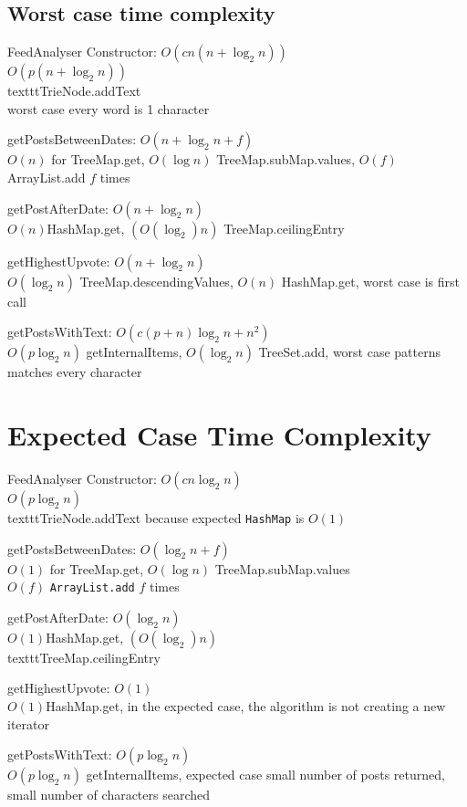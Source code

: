 \documentclass[11pt, oneside]{article}   	%
\begin{document}
\subsection{Worst case time complexity}

\begin{description}

\item FeedAnalyser Constructor: $O(c n (n + \log_2 n))$ \\
$O(p (n + \log_2 n))$ \\texttt{TrieNode.addText} \\ worst case every word is 1 character 
\item getPostsBetweenDates: $O(n + \log_2 n + f)$ \\
$O(n)$ for TreeMap.get, $O(\log n)$ TreeMap.subMap.values, $O(f)$ ArrayList.add $f$ times 
\item getPostAfterDate: $O(n + \log_2n)$ \\
$O(n)$HashMap.get, $(O(\log_2) n)$ TreeMap.ceilingEntry 
\item getHighestUpvote: $O(n + \log_2 n)$ \\
$O(\log_2 n)$ TreeMap.descendingValues, $O(n)$ HashMap.get, worst case is first call 
\item getPostsWithText: $O(c (p + n) \log_2 n + n^2)$ \\
$O(p \log_2 n)$ getInternalItems, $O(\log_2 n)$ TreeSet.add, worst case patterns matches every character 

\end{description}

\section{Expected Case Time Complexity}

\begin{description}

\item FeedAnalyser Constructor: $O(c n \log_2 n)$ \\ $O(p \log_2 n)$ \\texttt{TrieNode.addText} because expected \texttt{HashMap} is $O(1)$ 
\item getPostsBetweenDates: $O(\log_2 n + f)$ \\ $O(1)$ for TreeMap.get, $O(\log n)$ TreeMap.subMap.values \\ $O(f)$ \texttt{ArrayList.add} $f$ times 
\item getPostAfterDate: $O(\log_2n)$ \\ $O(1)$HashMap.get, $(O(\log_2) n)$ \\texttt{TreeMap.ceilingEntry}
\item getHighestUpvote: $O(1)$ \\ $O(1)$HashMap.get, in the expected case, the algorithm is not creating a new iterator 
\item getPostsWithText:  $O(p \log_2 n)$ \\ $O(p \log_2 n)$ getInternalItems, expected case small number of posts returned, small number of characters searched 

\end{description}
\end{document}
